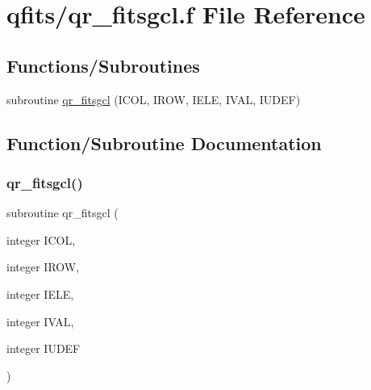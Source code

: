 \hypertarget{qr__fitsgcl_8f}{}\section{qfits/qr\+\_\+fitsgcl.f File Reference}
\label{qr__fitsgcl_8f}
\subsection*{Functions/\+Subroutines}
\begin{DoxyCompactItemize}
\item 
subroutine \hyperlink{qr__fitsgcl_8f_a389eb863e9bdbb124e5a43f89f2f74e2}{qr\+\_\+fitsgcl} (I\+C\+OL, I\+R\+OW, I\+E\+LE, I\+V\+AL, I\+U\+D\+EF)
\end{DoxyCompactItemize}


\subsection{Function/\+Subroutine Documentation}
\mbox{\label{qr__fitsgcl_8f_a389eb863e9bdbb124e5a43f89f2f74e2}} 
\subsubsection{\texorpdfstring{qr\+\_\+fitsgcl()}{qr\_fitsgcl()}}
{\footnotesize\ttfamily subroutine qr\+\_\+fitsgcl (\begin{DoxyParamCaption}\item[{integer}]{I\+C\+OL,  }\item[{integer}]{I\+R\+OW,  }\item[{integer}]{I\+E\+LE,  }\item[{integer}]{I\+V\+AL,  }\item[{integer}]{I\+U\+D\+EF }\end{DoxyParamCaption})}

